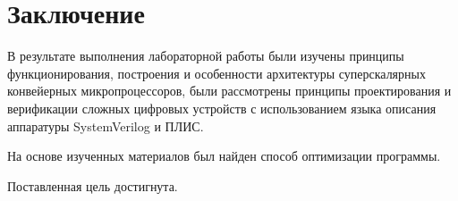 \chapter*{Заключение}

В результате выполнения лабораторной работы были изучены принципы функционирования, построения и особенности архитектуры суперскалярных конвейерных микропроцессоров, были рассмотрены принципы проектирования и верификации сложных цифровых устройств с использованием языка описания аппаратуры SystemVerilog и ПЛИС.

На основе изученных материалов был найден способ оптимизации программы.

Поставленная цель достигнута.